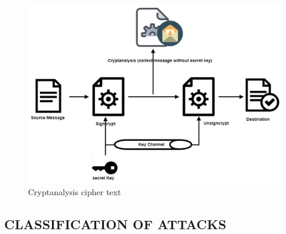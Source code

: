 \begin{figure}[h]
	\centering
	\includegraphics[scale=0.45]{imagenes/cryimage.png}
	\caption{Cryptanalysis cipher text}
\end{figure}

\subsection{CLASSIFICATION OF ATTACKS}

